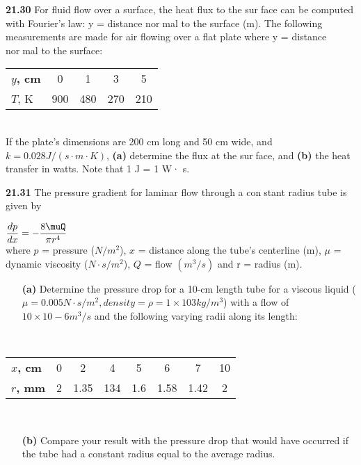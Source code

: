 \begin{multicols}{2}
\begin{tabular}{cccc}
	
\hline
\end{tabular}

\vspace{0,15 cm}

\textbf{21.30} For fluid flow over a surface, the heat flux to the surface can be computed with Fourier’s law: y = distance normal to the surface (m). The following measurements are made for air flowing over a flat plate where y = distance normal to the surface:\\
\begin{tabular}{lcccc}
\hline

	\textbf{$y$, cm} & 0 & 1 & 3 & 5\\
	
	\textbf{$T$}, K & 900 & 480 & 270 & 210\\
	
\hline
\end{tabular}\\
If the plate’s dimensions are 200 cm long and 50 cm wide,
and $k = 0.028 J/(s · m · K)$, \textbf{(a)} determine the flux at the surface, and \textbf{(b)} the heat transfer in watts. Note that 1 J = 1 W· s.

\textbf{21.31} The pressure gradient for laminar flow through a constant radius tube is given by

$\dfrac{dp}{dx} = - \dfrac{8\muQ}{\pi r^4}$\\
where $p$ = pressure ($N/m^2$), $x$ = distance along the tube’s
centerline (m), $μ$ = dynamic viscosity ($N · s/m^2$), $Q$ = flow
$(m^3/s)$ and r = radius (m).
\begin{enumerate}
	\item[\textbf{(a)}] Determine the pressure drop for a 10-cm length tube
for a viscous liquid ($μ = 0.005 N · s/m^2, density = ρ = 1 × 103 kg/m^3$) with a flow of $10 × 10−6 m^3/s$ and the following varying radii along its length: 
\end{enumerate}\\
\begin{tabular}{lccccccc}
\hline

	\textbf{$x$, cm} & 0 & 2 & 4 & 5 & 6 & 7 & 10\\
	\textbf{$r$, mm} & 2 & 1.35 & 134 & 1.6 & 1.58 & 1.42 & 2\\

\hline
\end{tabular}\\
\begin{enumerate}
	\item[\textbf{(b)}]Compare your result with the pressure drop that would
have occurred if the tube had a constant radius equal to
the average radius.


\end{enumerate}
\end{multicols}
